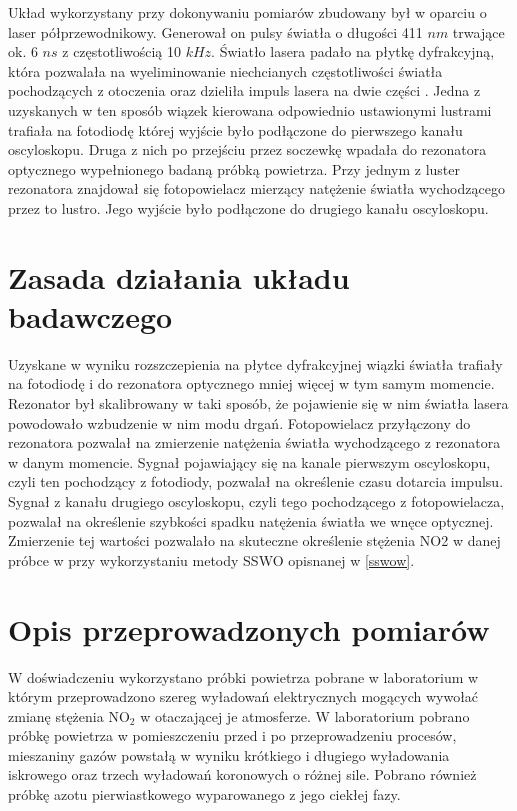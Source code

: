 \documentclass[10pt,a4paper]{article}
\begin{document}
Układ wykorzystany przy dokonywaniu pomiarów zbudowany był w oparciu o laser półprzewodnikowy. Generował on pulsy światła o długości 411 $nm$ trwające ok. 6 $ns$ z częstotliwością 10 $kHz$. Światło lasera padało na płytkę dyfrakcyjną, która pozwalała na wyeliminowanie niechcianych częstotliwości światła pochodzących z otoczenia oraz dzieliła impuls lasera na dwie części \cite{sswo}. Jedna z uzyskanych w ten sposób wiązek kierowana odpowiednio ustawionymi lustrami trafiała na fotodiodę której wyjście było podłączone do pierwszego kanału oscyloskopu. Druga z nich po przejściu przez soczewkę wpadała do rezonatora optycznego wypełnionego badaną próbką powietrza. Przy jednym z luster rezonatora znajdował się fotopowielacz mierzący natężenie światła wychodzącego przez to lustro.  Jego wyjście było podłączone do drugiego kanału oscyloskopu.

\section{Zasada działania układu badawczego} 
Uzyskane w wyniku rozszczepienia na płytce dyfrakcyjnej wiązki światła trafiały na fotodiodę i do rezonatora optycznego mniej więcej w tym samym momencie. Rezonator był skalibrowany w taki sposób, że pojawienie się w nim światła lasera powodowało wzbudzenie w nim modu drgań. Fotopowielacz przyłączony do rezonatora pozwalał na zmierzenie natężenia światła wychodzącego z rezonatora w danym momencie. Sygnał pojawiający się na kanale pierwszym oscyloskopu, czyli ten pochodzący z fotodiody, pozwalał na określenie czasu dotarcia impulsu. Sygnał z kanału drugiego oscyloskopu, czyli tego pochodzącego z fotopowielacza, pozwalał na określenie szybkości spadku natężenia światła we wnęce optycznej. Zmierzenie tej wartości pozwalało na skuteczne określenie stężenia NO2 w danej próbce w przy wykorzystaniu metody SSWO opisnanej w \ref{sswow}.

\section{Opis przeprowadzonych pomiarów}
W doświadczeniu wykorzystano próbki powietrza pobrane w laboratorium w którym przeprowadzono szereg wyładowań elektrycznych mogących wywołać zmianę stężenia $\text{NO}_{\text{2}}$ w otaczającej je atmosferze. W laboratorium pobrano próbkę powietrza w pomieszczeniu przed i po przeprowadzeniu procesów, mieszaniny gazów powstałą w wyniku krótkiego i długiego wyładowania iskrowego oraz  trzech wyładowań koronowych o różnej sile. Pobrano również próbkę azotu pierwiastkowego wyparowanego z jego ciekłej fazy. 
\end{document}
